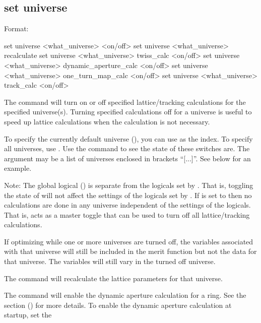 {{{{{\subsection{set universe}
\label{s:set.universe}

Format:
\begin{example}
  set universe <what_universe> <on/off>
  set universe <what_universe> recalculate
  set universe <what_universe> twiss_calc <on/off>
  set universe <what_universe> dynamic_aperture_calc <on/off>
  set universe <what_universe> one_turn_map_calc <on/off>
  set universe <what_universe> track_calc <on/off>
\end{example}

The  command will turn on or off specified lattice/tracking
calculations for the specified universe(s). Turning specified calculations off for a universe is
useful to speed up lattice calculations when the calculation is not necessary. 

To specify the currently default universe (), you can use  as the
 index. To specify all universes, use \vn{*}. Use the  command
to see the state of these switches are. The  argument may be a list of universes
enclosed in brackets ``[...]''. See below for an example.

Note: The global logical  () is separate from the logicals set
by . That is, toggling the state of  will not affect the
settings of the logicals set by . If  is set to  then
no calculations are done in any universe independent of the settings of the 
logicals. That is,  acts as a master toggle that can be used to turn off all
lattice/tracking calculations.

If optimizing while one or more universes are turned off, the variables associated with that
universe will still be included in the merit function but not the data for that universe. The
variables will still vary in the turned off universe.

The  command will recalculate the lattice parameters
for that universe.

The  command will enable the dynamic aperture
calculation for a ring. See the  section () for
more details. To enable the dynamic aperture calculation at startup, set the
\vn{design_lattice(i)%

}}}}}}
